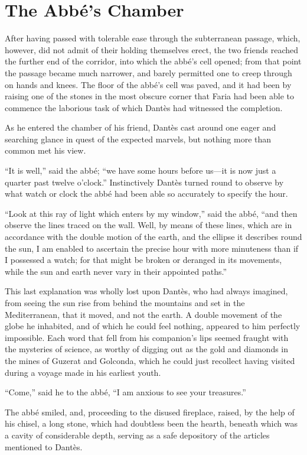 \chapter{The Abbé’s Chamber}

After having passed with tolerable ease through the subterranean
passage, which, however, did not admit of their holding themselves
erect, the two friends reached the further end of the corridor, into
which the abbé’s cell opened; from that point the passage became much
narrower, and barely permitted one to creep through on hands and knees.
The floor of the abbé’s cell was paved, and it had been by raising one
of the stones in the most obscure corner that Faria had been able to
commence the laborious task of which Dantès had witnessed the
completion.

As he entered the chamber of his friend, Dantès cast around one eager
and searching glance in quest of the expected marvels, but nothing more
than common met his view.

“It is well,” said the abbé; “we have some hours before us—it is now
just a quarter past twelve o’clock.” Instinctively Dantès turned round
to observe by what watch or clock the abbé had been able so accurately
to specify the hour.

“Look at this ray of light which enters by my window,” said the abbé,
“and then observe the lines traced on the wall. Well, by means of these
lines, which are in accordance with the double motion of the earth, and
the ellipse it describes round the sun, I am enabled to ascertain the
precise hour with more minuteness than if I possessed a watch; for that
might be broken or deranged in its movements, while the sun and earth
never vary in their appointed paths.”

This last explanation was wholly lost upon Dantès, who had always
imagined, from seeing the sun rise from behind the mountains and set in
the Mediterranean, that it moved, and not the earth. A double movement
of the globe he inhabited, and of which he could feel nothing, appeared
to him perfectly impossible. Each word that fell from his companion’s
lips seemed fraught with the mysteries of science, as worthy of digging
out as the gold and diamonds in the mines of Guzerat and Golconda,
which he could just recollect having visited during a voyage made in
his earliest youth.

“Come,” said he to the abbé, “I am anxious to see your treasures.”

The abbé smiled, and, proceeding to the disused fireplace, raised, by
the help of his chisel, a long stone, which had doubtless been the
hearth, beneath which was a cavity of considerable depth, serving as a
safe depository of the articles mentioned to Dantès.

